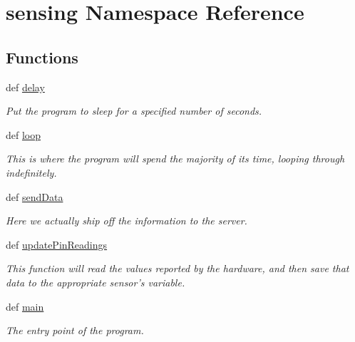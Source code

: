 \hypertarget{namespacesensing}{\section{sensing Namespace Reference}
\label{namespacesensing}
}
\subsection*{Functions}
\begin{DoxyCompactItemize}
\item 
def \hyperlink{namespacesensing_a110922c2a80aabf038d162595e137cc4}{delay}
\begin{DoxyCompactList}\small\item\em Put the program to sleep for a specified number of seconds. \end{DoxyCompactList}\item 
def \hyperlink{namespacesensing_afc4f85f529614a384ee1d04cd5ff80f3}{loop}
\begin{DoxyCompactList}\small\item\em This is where the program will spend the majority of its time, looping through indefinitely. \end{DoxyCompactList}\item 
def \hyperlink{namespacesensing_aeae2450fef0f1a9244c1ddc6d96ef4c2}{send\-Data}
\begin{DoxyCompactList}\small\item\em Here we actually ship off the information to the server. \end{DoxyCompactList}\item 
def \hyperlink{namespacesensing_a75479ff0f15da4027d590f94160bb43f}{update\-Pin\-Readings}
\begin{DoxyCompactList}\small\item\em This function will read the values reported by the hardware, and then save that data to the appropriate sensor's variable. \end{DoxyCompactList}\item 
def \hyperlink{namespacesensing_a38d7f8a9b27bbcf471a89725a5e78493}{main}
\begin{DoxyCompactList}\small\item\em The entry point of the program. \end{DoxyCompactList}\end{DoxyCompactItemize}
